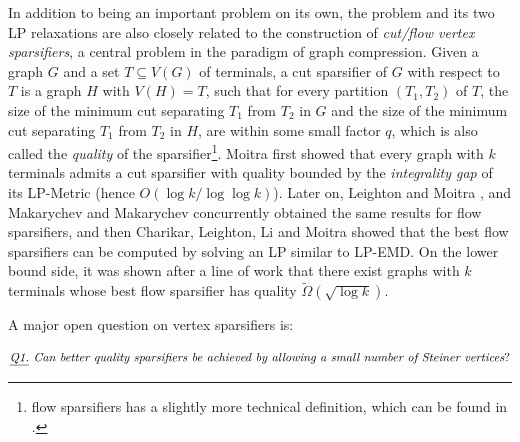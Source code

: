 In addition to being an important problem on its own, the \ze problem and its two LP relaxations are also closely related to the construction of \emph{cut/flow vertex sparsifiers}, a central problem in the paradigm of graph compression.
Given a graph $G$ and a set $T\subseteq V(G)$ of terminals, a cut sparsifier of $G$ with respect to $T$ is a graph $H$ with $V(H)=T$, such that for every partition $(T_1,T_2)$ of $T$, the size of the minimum cut separating $T_1$ from $T_2$ in $G$ and the size of the minimum cut separating $T_1$ from $T_2$ in $H$, are within some small factor $q$, which is also called the \emph{quality} of the sparsifier\footnote{flow sparsifiers has a slightly more technical definition, which can be found in \cite{hagerup1998characterizing,leighton2010extensions,chuzhoy2012vertex,andoni2014towards}.}.
Moitra \cite{moitra2009approximation} first showed that every graph with $k$ terminals admits a cut sparsifier with quality bounded by the \emph{integrality gap} of its \textsf{LP-Metric} (hence $O(\log k/\log\log k)$). Later on, Leighton and Moitra \cite{leighton2010extensions}, and Makarychev and Makarychev \cite{makarychev2010metric} concurrently obtained the same results for flow sparsifiers, and then Charikar, Leighton, Li and Moitra \cite{charikar2010vertex} showed that the best flow sparsifiers can be computed by solving an LP similar to \textsf{LP-EMD}. On the lower bound side, it was shown after a line of work \cite{leighton2010extensions,charikar2010vertex,makarychev2010metric} that there exist graphs with $k$ terminals whose best flow sparsifier has quality $\tilde\Omega(\sqrt{\log k})$.


A major open question on vertex sparsifiers is: 

\vspace{-10pt}
\[\emph{\underline{Q1.} Can better quality sparsifiers be achieved by allowing a small number of Steiner vertices}? 
\]
\vspace{-10pt}

